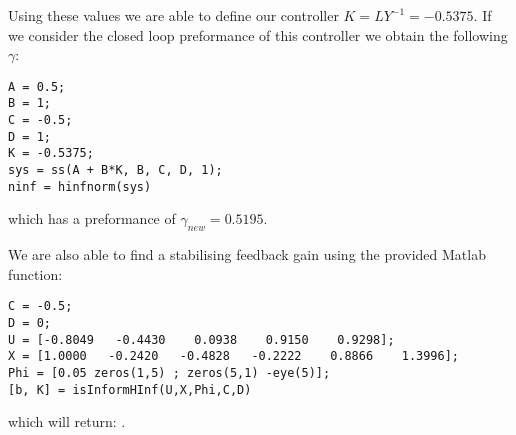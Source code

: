 Using these values we are able to define our controller $K = LY^{-1} = -0.5375$. If we consider the closed loop preformance of this controller we obtain the following $\gamma$:

\begin{lstlisting}
A = 0.5;
B = 1;
C = -0.5;
D = 1;
K = -0.5375;
sys = ss(A + B*K, B, C, D, 1);
ninf = hinfnorm(sys)
\end{lstlisting}
which has a preformance of $\gamma_{new} = 0.5195$. 

We are also able to find a stabilising feedback gain using the provided Matlab function:
\begin{lstlisting}
C = -0.5;
D = 0;
U = [-0.8049   -0.4430    0.0938    0.9150    0.9298];
X = [1.0000   -0.2420   -0.4828   -0.2222    0.8866    1.3996];
Phi = [0.05 zeros(1,5) ; zeros(5,1) -eye(5)];
[b, K] = isInformHInf(U,X,Phi,C,D)
\end{lstlisting}
which will return: \mon{[ 1, -0.5375 ]}.

























